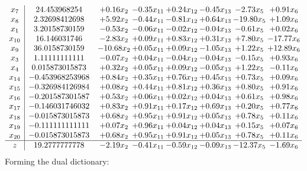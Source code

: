 \documentclass[8pt]{article}
\begin{document}
\[\begin{array}{c| c c@{\hskip 2pt} c@{\hskip 2pt} c@{\hskip 2pt} c@{\hskip 2pt} c@{\hskip 2pt} c@{\hskip 2pt} }
 x_{7}   &  24.453968254 & +  0.16 x_{2} & -0.35 x_{11} & +  0.24 x_{12} & -0.45 x_{13} & -2.73 x_{5} & +  0.91 x_{6}\\
 x_{8}   &  2.32698412698 & +  5.92 x_{2} & -0.44 x_{11} & -0.81 x_{12} & +  0.64 x_{13} & -19.80 x_{5} & +  1.09 x_{6}\\
 x_{1}   &  3.20158730159 & -0.53 x_{2} & -0.06 x_{11} & -0.02 x_{12} & -0.04 x_{13} & -0.61 x_{5} & +  0.02 x_{6}\\
 x_{10}   &  16.146031746 & -2.83 x_{2} & +  0.09 x_{11} & +  0.83 x_{12} & +  0.31 x_{13} & +  7.80 x_{5} & -17.77 x_{6}\\
 x_{9}   &  36.0158730159 & -10.68 x_{2} & +  0.05 x_{11} & +  0.09 x_{12} & -1.05 x_{13} & +  1.22 x_{5} & + 12.89 x_{6}\\
 x_{3}   &  1.11111111111 & -0.07 x_{2} & +  0.04 x_{11} & -0.04 x_{12} & -0.04 x_{13} & -0.15 x_{5} & +  0.93 x_{6}\\
 x_{4}   &  0.015873015873 & +  0.32 x_{2} & +  0.05 x_{11} & +  0.09 x_{12} & -0.05 x_{13} & +  1.22 x_{5} & -0.11 x_{6}\\
 x_{14}   &  -0.453968253968 & +  0.84 x_{2} & +  0.35 x_{11} & +  0.76 x_{12} & +  0.45 x_{13} & +  0.73 x_{5} & +  0.09 x_{6}\\
 x_{15}   &  -0.326984126984 & +  0.08 x_{2} & +  0.44 x_{11} & +  0.81 x_{12} & +  0.36 x_{13} & +  0.80 x_{5} & +  0.91 x_{6}\\
 x_{16}   &  -0.201587301587 & +  0.53 x_{2} & +  0.06 x_{11} & +  0.02 x_{12} & +  0.04 x_{13} & +  0.61 x_{5} & +  0.98 x_{6}\\
 x_{17}   &  -0.146031746032 & +  0.83 x_{2} & +  0.91 x_{11} & +  0.17 x_{12} & +  0.69 x_{13} & +  0.20 x_{5} & +  0.77 x_{6}\\
 x_{18}   &  -0.015873015873 & +  0.68 x_{2} & +  0.95 x_{11} & +  0.91 x_{12} & +  0.05 x_{13} & +  0.78 x_{5} & +  0.11 x_{6}\\
 x_{19}   &  -0.111111111111 & +  0.07 x_{2} & +  0.96 x_{11} & +  0.04 x_{12} & +  0.04 x_{13} & +  0.15 x_{5} & +  0.07 x_{6}\\
 x_{20}   &  -0.015873015873 & +  0.68 x_{2} & +  0.95 x_{11} & +  0.91 x_{12} & +  0.05 x_{13} & +  0.78 x_{5} & +  0.11 x_{6}\\
\hline
z    &  19.2777777778 & -2.19 x_{2} & -0.41 x_{11} & -0.59 x_{12} & -0.09 x_{13} & -12.37 x_{5} & -1.69 x_{6}\\
\end{array}\]
Forming the dual dictionary:
\end{document}
